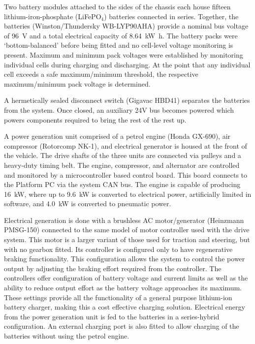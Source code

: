 \documentclass[preprint,authoryear,12pt]{elsarticle}
\begin{document}
        Two battery modules attached to the sides of the chassis each house fifteen lithium-iron-phosphate (LiFePO$_{\text{4}}$) batteries connected in series.
        Together, the batteries (Winston/Thundersky WB-LYP90AHA) provide a nominal bus voltage of \SI{96}{\volt} and a total electrical capacity of \SI{8.64}{\kilo\watt\hour}.
        The battery packs were `bottom-balanced' before being fitted and no cell-level voltage monitoring is present.
        Maximum and minimum pack voltages were established by monitoring individual cells during charging and discharging.
        At the point that any individual cell exceeds a safe maximum/minimum threshold, the respective maximum/minimum pack voltage is determined.

        A hermetically sealed disconnect switch (Gigavac HBD41) separates the batteries from the system.
        Once closed, an auxiliary 24V bus becomes powered which powers components required to bring the rest of the rest up.

        A power generation unit comprised of a petrol engine (Honda GX-690), air compressor (Rotorcomp NK-1), and electrical generator is housed at the front of the vehicle.
        The drive shafts of the three units are connected via pulleys and a heavy-duty timing belt.
        The engine, compressor, and alternator are controlled and monitored by a microcontroller based control board.
        This board connects to the Platform PC via the system CAN bus.
        The engine is capable of producing \SI{16}{\kilo\watt}, where up to \SI{9.6}{\kilo\watt} is converted to electrical power, artificially limited in software, and \SI{4.0}{\kilo\watt} is converted to pneumatic power.

        Electrical generation is done with a brushless AC motor/generator (Heinzmann PMSG-150) connected to the same model of motor controller used with the drive system.
        This motor is a larger variant of those used for traction and steering, but with no gearbox fitted.
        Its controller is configured only to have regenerative braking functionality.
        This configuration allows the system to control the power output by adjusting the braking effort required from the controller.
        The controllers offer configuration of battery voltage and current limits as well as the ability to reduce output effort as the battery voltage approaches its maximum.
        These settings provide all the functionality of a general purpose lithium-ion battery charger, making this a cost effective charging solution.
        Electrical energy from the power generation unit is fed to the batteries in a series-hybrid configuration.
        An external charging port is also fitted to allow charging of the batteries without using the petrol engine.
\end{document}

